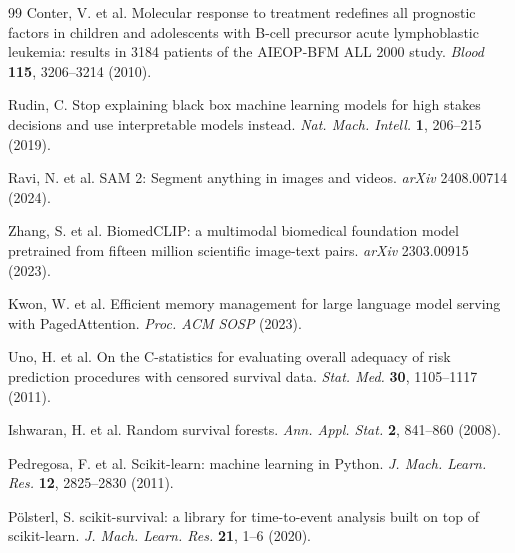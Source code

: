 \documentclass[pdflatex,sn-nature]{sn-jnl}
\begin{document}
\begin{thebibliography}{99}
Conter, V. et al.
Molecular response to treatment redefines all prognostic factors in
children and adolescents with B-cell precursor acute lymphoblastic
leukemia: results in 3184 patients of the AIEOP-BFM ALL 2000 study.
\textit{Blood} \textbf{115}, 3206--3214 (2010).

Rudin, C.
Stop explaining black box machine learning models for high stakes
decisions and use interpretable models instead.
\textit{Nat. Mach. Intell.} \textbf{1}, 206--215 (2019).

Ravi, N. et al.
SAM 2: Segment anything in images and videos.
\textit{arXiv} 2408.00714 (2024).

Zhang, S. et al.
BiomedCLIP: a multimodal biomedical foundation model pretrained from
fifteen million scientific image-text pairs.
\textit{arXiv} 2303.00915 (2023).

Kwon, W. et al.
Efficient memory management for large language model serving with
PagedAttention.
\textit{Proc. ACM SOSP} (2023).

Uno, H. et al.
On the C-statistics for evaluating overall adequacy of risk prediction
procedures with censored survival data.
\textit{Stat. Med.} \textbf{30}, 1105--1117 (2011).

Ishwaran, H. et al.
Random survival forests.
\textit{Ann. Appl. Stat.} \textbf{2}, 841--860 (2008).

Pedregosa, F. et al.
Scikit-learn: machine learning in Python.
\textit{J. Mach. Learn. Res.} \textbf{12}, 2825--2830 (2011).

P\"olsterl, S.
scikit-survival: a library for time-to-event analysis built on top
of scikit-learn.
\textit{J. Mach. Learn. Res.} \textbf{21}, 1--6 (2020).

\end{thebibliography}
\end{document}
